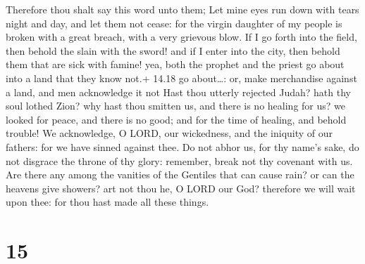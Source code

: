  Therefore thou shalt say this word unto them; Let mine
eyes run down with tears night and day, and let them not cease: for the
virgin daughter of my people is broken with a great breach, with a very
grievous blow.  If I go forth into the field, then behold
the slain with the sword! and if I enter into the city, then behold them
that are sick with famine! yea, both the prophet and the priest go about
into a land that they know not.+ 14.18 go about\ldots: or, make
merchandise against a land, and men acknowledge it not 
Hast thou utterly rejected Judah? hath thy soul lothed Zion? why hast
thou smitten us, and there is no healing for us? we looked for peace,
and there is no good; and for the time of healing, and behold trouble!
 We acknowledge, O LORD, our wickedness, and the iniquity
of our fathers: for we have sinned against thee.  Do not
abhor us, for thy name's sake, do not disgrace the throne of thy glory:
remember, break not thy covenant with us.  Are there any
among the vanities of the Gentiles that can cause rain? or can the
heavens give showers? art not thou he, O LORD our God? therefore we will
wait upon thee: for thou hast made all these things.

\hypertarget{section-14}{%
\section{15}\label{section-14}}

